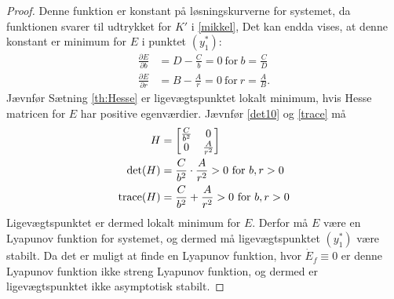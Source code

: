 \begin{proof}
Denne funktion er konstant på løsningskurverne for systemet, da funktionen svarer til udtrykket for $K'$ i \eqref{mikkel}, Det kan endda vises, at denne konstant er minimum for $E$ i punktet $(y_1^*)$:
\begin{align*}
    \frac{\partial E}{\partial b}&=D-\frac{C}{b}=0 \ \text{for} \ b=\frac{C}{D}\\
    \frac{\partial E}{\partial r}&=B-\frac{A}{r}=0 \ \text{for} \ r=\frac{A}{B}.
\end{align*}
Jævnfør Sætning \ref{th:Hesse} er ligevægtspunktet lokalt minimum, hvis Hesse matricen for $E$ har positive egenværdier. Jævnfør \eqref{det10} og \eqref{trace} må
\begin{align*}
  H&= \begin{bmatrix}
   \frac{C}{b^2} & 0 \\
   0 & \frac{A}{r^2}
   \end{bmatrix} \\
  \det (H)&=\frac{C}{b^2}\cdot \frac{A}{r^2}>0 \ \text{for} \ b,r>0 \\
  \textnormal{trace} (H)&= \frac{C}{b^2}+\frac{A}{r^2}>0 \ \text{for} \ b,r>0
\end{align*}
Ligevægtspunktet er dermed lokalt minimum for $E$. Derfor må $E$ være en Lyapunov funktion for systemet, og dermed må ligevægtspunktet $(y_1^*)$ være stabilt. Da det er muligt at finde en Lyapunov funktion, hvor $\dot{E}_f\equiv0$ er denne Lyapunov funktion ikke streng Lyapunov funktion, og dermed er ligevægtspunktet ikke asymptotisk stabilt.
\end{proof}

